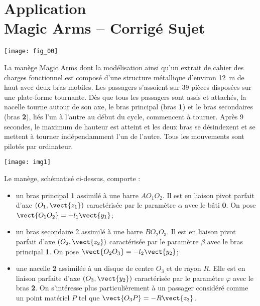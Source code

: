 \chapter*{Application  \\ 
Magic Arms -- \ifprof Corrigé \else Sujet \fi}

\iflivret {} \else
\ifprof  {} \else \fi
\fi

\setcounter{question}{0}
\marginnote[1cm]{
}

\begin{marginfigure}
\texttt{[image: fig\_00]}
\end{marginfigure}


La manège Magic Arms dont la modélisation ainsi qu'un extrait de cahier des charges fonctionnel est composé d'une structure métallique d'environ \SI{12}{m} de haut avec deux bras mobiles. Les passagers s'assoient sur 39 pièces disposées sur une plate-forme tournante. Dès que tous les passagers sont assis et attachés, la nacelle tourne autour de son axe, le bras principal (bras \textbf{1}) et le bras secondaires (bras \textbf{2}), liés l'un à l'autre au début du cycle, commencent à tourner. Après 9 secondes, le maximum de hauteur est atteint et les deux bras se désindexent et se mettent à tourner indépendamment l'un de l'autre. Tous les mouvements sont pilotés par ordinateur. 

\begin{center}
\texttt{[image: img1]}
\end{center}

Le manège, schématisé ci-dessus, comporte :
\begin{itemize}
\item un bras principal \textbf{1} assimilé à une barre $AO_1O_2$. Il est en liaison pivot parfait d'axe $(O_1,\vect{z_1})$ caractérisée par le paramètre $\alpha$ avec le bâti \textbf{0}. On pose $\vect{O_1O_2}=-l_1\vect{y_1}$;
\item un bras secondaire 2 assimilé à une barre $BO_2O_3$. Il est en liaison pivot parfait d'axe $(O_2,\vect{z_2})$ caractérisée par le paramètre $\beta$ avec le bras principal \textbf{1}. On pose $\vect{O_2O_3}=-l_2\vect{y_2}$;
\item une nacelle \textbf{2} assimilée à un disque de centre $O_3$ et de rayon $R$. Elle est en liaison parfaite d'axe $(O_3,\vect{y_2})$ caractérisée par le paramètre $\varphi$ avec le bras \textbf{2}. On s'intéresse plus particulièrement à un passager considéré comme un point matériel $P$ tel que $\vect{O_3P}=-R\vect{z_3}$.
\end{itemize}

